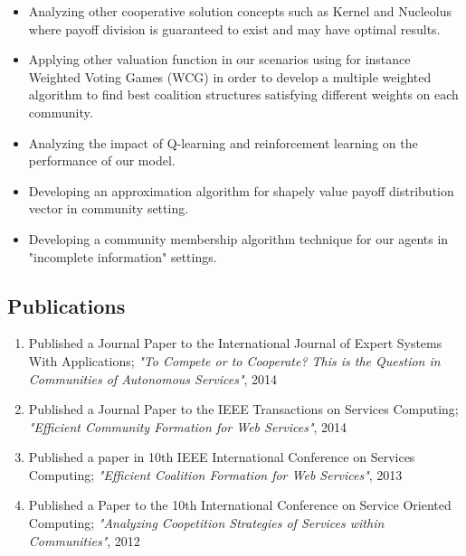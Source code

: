 \begin{itemize}
\item Analyzing other cooperative solution concepts such as Kernel
and Nucleolus where payoff division is guaranteed to exist and may
have optimal results.

\item Applying other valuation function in our scenarios using for
instance Weighted Voting Games (WCG) in order to develop a
multiple weighted algorithm to find best coalition structures
satisfying different weights on each community.

\item Analyzing the impact of Q-learning and reinforcement
learning on the performance of our model.

\item Developing an approximation algorithm for shapely value
payoff distribution vector in community setting.

\item Developing a community membership algorithm technique for
our agents in "incomplete information" settings.

\end{itemize}

\subsection {Publications }

    \begin{enumerate}        
        \item Published a Journal Paper to the International Journal of Expert Systems With Applications; \emph{"To Compete or to Cooperate? This is the Question in Communities of Autonomous Services"}, 2014
        \item Published a Journal Paper to the IEEE Transactions on Services Computing; \emph{"Efficient Community Formation for Web Services"}, 2014        
        \item Published a paper in 10th IEEE International Conference on Services Computing; \emph{"Efficient Coalition Formation for Web Services"}, 2013
        \item Published a Paper to the 10th International Conference on Service Oriented Computing; \emph{"Analyzing Coopetition Strategies of Services within Communities"}, 2012        
    \end{enumerate}

